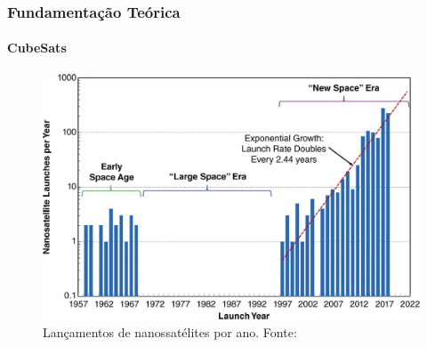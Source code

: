 \documentclass[aspectratio=169]{beamer}
\begin{document}
\begin{frame}
\frametitle{Fundamentação Teórica}
\framesubtitle{CubeSats}

\begin{figure}
  \centering
  \includegraphics[scale=0.25]{img/Launches.png}
  \caption{Lançamentos de nanossatélites por ano. Fonte: }
\end{figure}

\end{frame}
\end{document}
